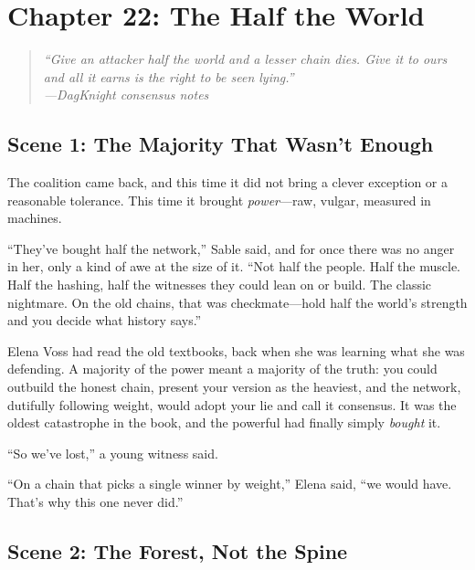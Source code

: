 \hypertarget{chapter-22-the-half-the-world}{%
\section{Chapter 22: The Half the
World}\label{chapter-22-the-half-the-world}}

\begin{quote}
\itshape ``Give an attacker half the world and a lesser chain dies. Give it to
ours and all it earns is the right to be seen lying.''\\
\normalfont\hfill---DagKnight consensus notes
\end{quote}

\hypertarget{scene-1-the-majority-that-wasnt-enough}{%
\subsection{Scene 1: The Majority That Wasn't
Enough}\label{scene-1-the-majority-that-wasnt-enough}}

The coalition came back, and this time it did not bring a clever exception or a
reasonable tolerance. This time it brought \emph{power}---raw, vulgar, measured in
machines.

``They've bought half the network,'' Sable said, and for once there was no anger in
her, only a kind of awe at the size of it. ``Not half the people. Half the muscle.
Half the hashing, half the witnesses they could lean on or build. The classic
nightmare. On the old chains, that was checkmate---hold half the world's strength
and you decide what history says.''

Elena Voss had read the old textbooks, back when she was learning what she was
defending. A majority of the power meant a majority of the truth: you could outbuild
the honest chain, present your version as the heaviest, and the network, dutifully
following weight, would adopt your lie and call it consensus. It was the oldest
catastrophe in the book, and the powerful had finally simply \emph{bought} it.

``So we've lost,'' a young witness said.

``On a chain that picks a single winner by weight,'' Elena said, ``we would have.
That's why this one never did.''

\hypertarget{scene-2-the-forest-not-the-spine}{%
\subsection{Scene 2: The Forest, Not the
Spine}\label{scene-2-the-forest-not-the-spine}}

